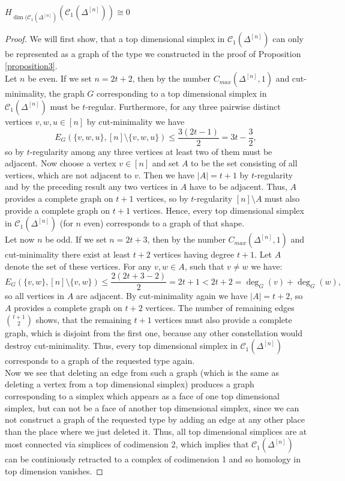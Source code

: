 \begin{thm}\label{theorem3}
\(H_{\dim(\mathcal{C}_1(\Delta^{[n]})}(\mathcal{C}_1(\Delta^{[n]}))\cong 0\)
\begin{proof}
We will first show, that a top dimensional simplex in \(\mathcal{C}_1(\Delta^{[n]})\) can only be represented as a graph of the type we constructed in the proof of Proposition \ref{proposition3}.\\
Let \(n\) be even. If we set \(n=2t+2\), then by the number \(C_{max}(\Delta^{[n]},1)\) and cut-minimality, the graph \(G\) corresponding to a top dimensional simplex in \(\mathcal{C}_1(\Delta^{[n]})\) must be \(t\)-regular. Furthermore, for any three pairwise distinct vertices \(v,w,u\in [n]\) by cut-minimality we have
\[
E_G(\{v,w,u\},[n]\setminus\{v,w,u\})\leq\frac{3(2t-1)}{2}=3t-\frac{3}{2},
\]
so by \(t\)-regularity among any three vertices at least two of them must be adjacent. Now choose a vertex \(v\in [n]\) and set \(A\) to be the set consisting of all vertices, which are not adjacent to \(v\). Then we have \(|A|=t+1\) by \(t\)-regularity and by the preceding result any two vertices in \(A\) have to be adjacent. Thus, \(A\) provides a complete graph on \(t+1\) vertices, so by \(t\)-regularity \([n]\setminus A\) must also provide a complete graph on \(t+1\) vertices. Hence, every top dimensional simplex in \(\mathcal{C}_1(\Delta^{[n]})\) (for \(n\) even) corresponds to a graph of that shape.\\
Let now \(n\) be odd. If we set \(n=2t+3\), then by the number \(C_{max}(\Delta^{[n]},1)\) and cut-minimality there exist at least \(t+2\) vertices having degree \(t+1\). Let \(A\) denote the set of these vertices. For any \(v,w\in A\), such that \(v\neq w\) we have:
\[
E_G(\{v,w\},[n]\setminus\{v,w\})\leq\frac{2(2t+3-2)}{2}=2t+1<2t+2=\deg_G(v)+\deg_G(w),
\]
so all vertices in \(A\) are adjacent. By cut-minimality again we have \(|A|=t+2\), so \(A\) provides a complete graph on \(t+2\) vertices. The number of remaining edges \(\binom{t+1}{2}\) shows, that the remaining \(t+1\) vertices must also provide a complete graph, which is disjoint from the first one, because any other constellation would destroy cut-minimality. Thus, every top dimensional simplex in \(\mathcal{C}_1(\Delta^{[n]})\) corresponds to a graph of the requested type again.\\
Now we see that deleting an edge from such a graph (which is the same as deleting a vertex from a top dimensional simplex) produces a graph corresponding to a simplex which appears as a face of one top dimensional simplex, but can not be a face of another top dimensional simplex, since we can not construct a graph of the requested type by adding an edge at any other place than the place where we just deleted it. Thus, all top dimensional simplices are at most connected via simplices of codimension 2, which implies that \(\mathcal{C}_1(\Delta^{[n]})\) can be continiously retracted to a complex of codimension 1 and so homology in top dimension vanishes.
\end{proof}
\end{thm}

